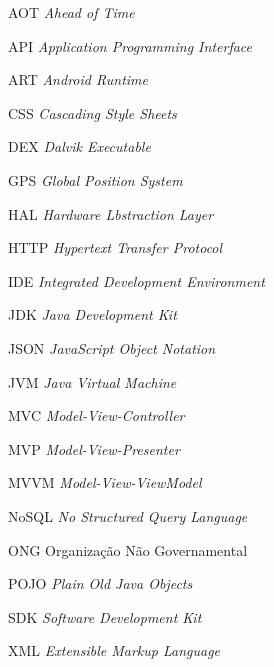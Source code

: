 \documentclass[
	12pt,				%
	openright,			%
	twoside,			%
	a4paper,			%
	english,			%
	french,				%
	spanish,			%
	brazil				%
	]{abntex2}
\begin{document}
\begin{siglas}

   \item[AOT] \textit{Ahead of Time}
   \item[API] \textit{Application Programming Interface}   
   \item[ART] \textit{Android Runtime}
   \item[CSS] \textit{Cascading Style Sheets}
   \item[DEX] \textit{Dalvik Executable}
   \item[GPS] \textit{Global Position System}
   \item[HAL] \textit{Hardware Lbstraction Layer}
   \item[HTTP] \textit{Hypertext Transfer Protocol}
   \item[IDE] \textit{Integrated Development Environment}   
   \item[JDK] \textit{Java Development Kit}
   \item[JSON] \textit{JavaScript Object Notation}
   \item[JVM] \textit{Java Virtual Machine}
   \item[MVC] \textit{Model-View-Controller}
   \item[MVP] \textit{Model-View-Presenter}
   \item[MVVM] \textit{Model-View-ViewModel}   
   \item[NoSQL] \textit{No Structured Query Language}
   \item[ONG]  {Organização Não Governamental}
   \item[POJO] \textit{Plain Old Java Objects}
   \item[SDK] \textit{Software Development Kit}
   \item[XML] \textit{Extensible Markup Language}
\end{siglas}




\end{document}
